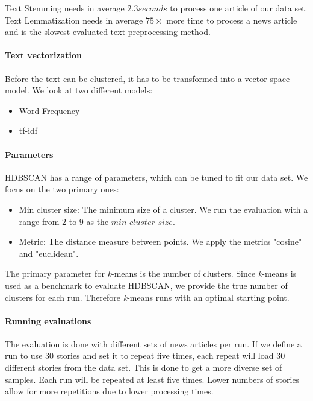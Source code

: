 Text Stemming needs in average $2.3 seconds$ to process one article of our data set.
Text Lemmatization needs in average $75\times$ more time to process a news article and is
the slowest evaluated text preprocessing method.

\paragraph{Text vectorization}
Before the text can be clustered, it has to be transformed into a vector space model.
We look at two different models:

\begin{itemize}
    \item Word Frequency
    \item tf-idf
\end{itemize}

\paragraph{Parameters}
HDBSCAN has a range of parameters, which can be tuned to fit our data set.
We focus on the two primary ones:

\begin{itemize}
    \item Min cluster size: The minimum size of a cluster.
          We run the evaluation with a range from 2 to 9 as the $min\_cluster\_size$.
    \item Metric: The distance measure between points.
          We apply the metrics "cosine" and "euclidean".
\end{itemize}

The primary parameter for \textit{k}-means is the number of clusters.
Since \textit{k}-means is used as a benchmark to evaluate HDBSCAN, we provide the true number of clusters for each run.
Therefore \textit{k}-means runs with an optimal starting point.

\paragraph{Running evaluations}
The evaluation is done with different sets of news articles per run.
If we define a run to use 30 stories and set it to repeat five times,
each repeat will load 30 different stories from the data set.
This is done to get a more diverse set of samples.
Each run will be repeated at least five times.
Lower numbers of stories allow for more repetitions due to lower processing times.

